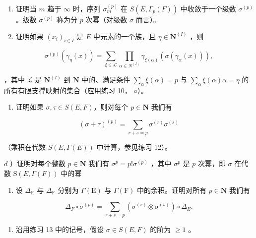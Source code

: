 \begin{enumerate}
\def\labelenumi{\alph{enumi})}
\item
  证明当 \(m\) 趋于 \(\infty\) 时，序列 \(\sigma_{m}^{(p)}\) 在 \(S(E, \Gamma_p(F))\) 中收敛于一个级数 \(\sigma^{(p)}\) 。级数 \(\sigma^{(p)}\) 称为分 \(p\) 次幂（对级数 \(\sigma\) 而言）。
\item
  证明如果 \((x_{i})_{i\in I}\) 是 \(E\) 中元素的一个族，且 \(\eta \in \mathbf{N}^{(I)}\) ，则
\end{enumerate}

\[
\sigma^ {(p)} \left(\gamma_ {\eta} (x)\right) = \sum_ {\xi \in \mathscr {L}} \prod_ {\alpha \in N ^ {(I)}} \gamma_ {\xi (\alpha)} \left(\sigma \left(\gamma_ {\alpha} (x)\right)\right),
\]

，其中 \(\mathcal{L}\) 是 \(\mathbf{N}^{(I)}\) 到 \(\mathbf{N}\) 中的、满足条件 \(\sum_{\alpha} \xi(\alpha) = p\) 与 \(\sum_{\alpha} \xi(\alpha) \alpha = \eta\) 的所有有限支撑映射的集合（应用练习 10， \(a\)）。

\begin{enumerate}
\def\labelenumi{\alph{enumi})}
\setcounter{enumi}{2}
\tightlist
\item
  证明如果 \(\sigma, \tau \in S(E, F)\)，则对每个 \(p \in \mathbf{N}\) 我们有
\end{enumerate}

\[
\left(\sigma + \tau\right) ^ {(p)} = \sum_ {r + s = p} \sigma^ {(r)} \sigma^ {(s)}
\]

（乘积在代数 \(S(E, \Gamma(E))\) 中计算，参见练习 12）。

\(d\) ）证明对每个整数 \(p\in \mathbf{N}\) 我们有 \(\sigma^p = p!\sigma^{(p)}\) ，其中 \(\sigma^p\) 是 \(p\) 次幂，即 \(\sigma\) 在代数 \(\mathrm{S}(E, \Gamma(F))\) 中的幂

\begin{enumerate}
\def\labelenumi{\alph{enumi})}
\setcounter{enumi}{4}
\tightlist
\item
  设 \(\Delta_{\mathrm{E}}\) 与 \(\Delta_{\mathrm{F}}\) 分别为 \(\Gamma(\mathrm{E})\) 与 \(\Gamma(\mathrm{F})\) 中的余积。证明对所有 \(p \in \mathbf{N}\) 我们有
\end{enumerate}

\[
\Delta_ {F} \circ \sigma^ {(p)} = \sum_ {r + s = p} \left(\sigma^ {(r)} \otimes \sigma^ {(s)}\right) \circ \Delta_ {E}.
\]

\begin{enumerate}
\def\labelenumi{\arabic{enumi})}
\setcounter{enumi}{13}
\tightlist
\item
  沿用练习 13 中的记号，假设 \(\sigma \in S(E, F)\) 的阶为 \(\geqslant 1\) 。
\end{enumerate}

